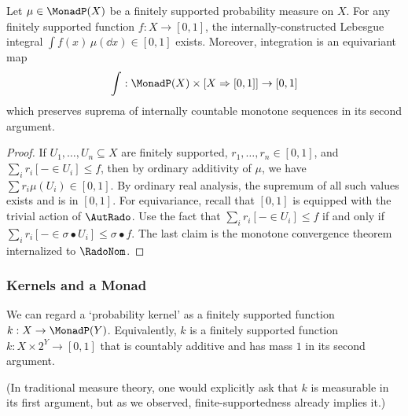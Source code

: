 \begin{proposition}\label{prop:internal-integration}
  Let $\mu\in \MonadP (X)$ be a finitely supported probability measure
  on $X$.
  For any finitely supported function $f\colon X\to [0,1]$,
  the internally-constructed Lebesgue integral $\int f(x)\,\mu(\dd x) \in [0,1]$ exists.
  Moreover, integration is an equivariant map
  \[
    \int : \MonadP (X)\times [X\Rightarrow [0,1]]\to [0,1]
  \]
  which preserves suprema of internally countable monotone sequences in its second argument.
  \end{proposition}
  \begin{proof}
    If $U_1,\ldots,U_n \subseteq X$ are finitely supported, $r_1,\ldots,r_n \in [0,1]$, and $\sum_i r_i [- \in U_i] \leq f$, then by ordinary additivity of $\mu$, we have $\sum r_i \mu(U_i) \in [0,1]$.
    By ordinary real analysis, the supremum of all such values exists and is in $[0,1]$.
    For equivariance, recall that $[0,1]$ is equipped with the trivial action of $\AutRado$. Use the fact that $\sum_i r_i [- \in U_i] \leq f$ if and only if $\sum_i r_i [- \in \sigma\bullet U_i] \leq \sigma \bullet f$.
    The last claim is the monotone convergence theorem internalized to $\RadoNom$.
  \end{proof}

\subsubsection{Kernels and a Monad}
  We can regard a `probability kernel' as a finitely supported function
  $k:X\to \MonadP (Y)$. Equivalently, $k$ is a finitely supported function
  $k:X\times 2^Y\to[0,1]$ that is countably additive and has mass $1$ in its second
  argument. 

  (In traditional measure theory, one would explicitly ask that $k$ is measurable
  in its first argument, but as we observed, finite-supportedness already implies it.)
  
